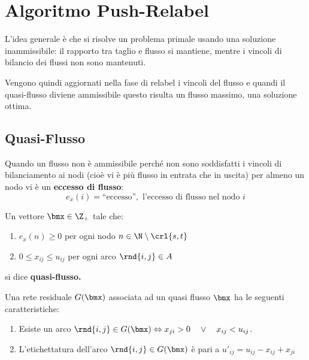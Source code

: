 \documentclass[\main/main.tex]{subfiles}
\begin{document}
\chapter{Algoritmo Push-Relabel}
L'idea generale è che si risolve un problema primale usando una soluzione inammissibile: il rapporto tra taglio e flusso si mantiene, mentre i vincoli di bilancio dei flussi non sono mantenuti.

Vengono quindi aggiornati nella fase di relabel i vincoli del flusso e quandi il quasi-flusso diviene ammissibile questo risulta un flusso massimo, una soluzione ottima.

\section{Quasi-Flusso}
\begin{definition}
  Quando un flusso non è ammissibile perché non sono soddisfatti i vincoli di bilanciamento ai nodi (cioè vi è più flusso in entrata che in uscita) per almeno un nodo vi è un \textbf{eccesso di flusso}:
  \[
    e_x(i)=\text{``eccesso''}, \text{ l'eccesso di flusso nel nodo \(i\)}
  \]
\end{definition}
\begin{definition}
  Un vettore \(\bmx \in \Z_+\) tale che:
  \begin{enumerate}
    \item \(e_x(n) \geq 0\) per ogni nodo \(n \in \N \setminus \crl{s,t}\)
    \item \(0 \leq x_{ij} \leq u_{ij}\) per ogni arco \(\rnd{i,j} \in A\)
  \end{enumerate}
  si dice \textbf{quasi-flusso.}
\end{definition}

\begin{definition}
  Una rete residuale \(G(\bmx)\) associata ad un quasi flusso \(\bmx\) ha le seguenti caratteristiche:
  \begin{enumerate}
    \item Esiste un arco \(\rnd{i,j} \in G(\bmx) \Leftrightarrow x_{ji} > 0 \quad \lor \quad x_{ij} < u_{ij}\).
    \item L'etichettatura dell'arco \(\rnd{i,j} \in G(\bmx)\) è pari a \(u'_{ij} = u_{ij} - x_{ij} + x_{ji}\)
  \end{enumerate}
\end{definition}
\end{document}
